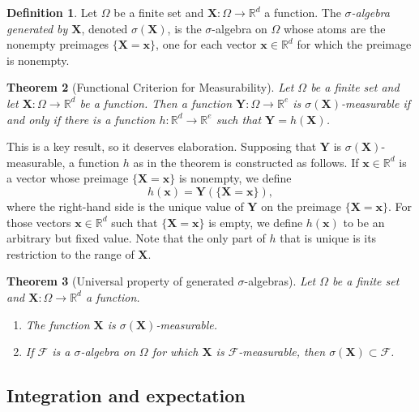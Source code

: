 \documentclass[11pt]{book}
\newtheorem{thm}{Theorem}[section]
\theoremstyle{definition}
\newtheorem{defn}[thm]{Definition}
\numberwithin{equation}{section}
\begin{document}
\begin{defn}
	Let $\Omega$ be a finite set and $\mathbf{X}: \Omega \to \mathbb{R}^d$ a function. The \textit{$\sigma$-algebra generated by $\mathbf{X}$}, denoted $\sigma(\mathbf{X})$, is the $\sigma$-algebra on $\Omega$ whose atoms are the nonempty preimages $\{\mathbf{X} = \mathbf{x}\}$, one for each vector $\mathbf{x}\in \mathbb{R}^d$ for which the preimage is nonempty.
\end{defn}

\begin{thm}[Functional Criterion for Measurability]\label{thm:functional-criterion-measurable}
	Let $\Omega$ be a finite set and let $\mathbf{X}: \Omega \to \mathbb{R}^d$ be a function. Then a function $\mathbf{Y}: \Omega \to \mathbb{R}^e$ is $\sigma(\mathbf{X})$-measurable if and only if there is a function $h: \mathbb{R}^d \to \mathbb{R}^e$ such that $\mathbf{Y} = h(\mathbf{X})$.
\end{thm}

This is a key result, so it deserves elaboration. Supposing that $\mathbf{Y}$ is $\sigma(\mathbf{X})$-measurable, a function $h$ as in the theorem is constructed as follows. If $\mathbf{x}\in \mathbb{R}^d$ is a vector whose preimage $\{\mathbf{X} = \mathbf{x}\}$ is nonempty, we define
\[
	h(\mathbf{x}) = \mathbf{Y}(\{\mathbf{X} = \mathbf{x}\}),
\]
where the right-hand side is the unique value of $\mathbf{Y}$ on the preimage $\{\mathbf{X} = \mathbf{x}\}$. For those vectors $\mathbf{x}\in \mathbb{R}^d$ such that $\{\mathbf{X} = \mathbf{x}\}$ is empty, we define $h(\mathbf{x})$ to be an arbitrary but fixed value. Note that the only part of $h$ that is unique is its restriction to the range of $\mathbf{X}$.

\begin{thm}[Universal property of generated $\sigma$-algebras]
	Let $\Omega$ be a finite set and $\mathbf{X}: \Omega \to \mathbb{R}^d$ a function.
	\begin{enumerate}
		\item The function $\mathbf{X}$ is $\sigma(\mathbf{X})$-measurable.
		\item If $\mathcal{F}$ is a $\sigma$-algebra on $\Omega$ for which $\mathbf{X}$ is $\mathcal{F}$-measurable, then $\sigma(\mathbf{X}) \subset \mathcal{F}$.
	\end{enumerate}
\end{thm}

\subsection{Integration and expectation}
\end{document}
